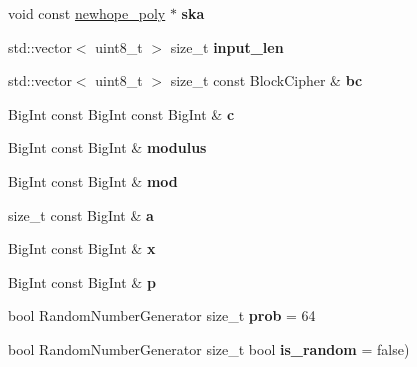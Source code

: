 \begin{DoxyCompactItemize}
\item 
\mbox{\label{namespace_botan_a5ed03ef32cb37696f691920d798ba5bf}} 
void const \hyperlink{class_botan_1_1newhope__poly}{newhope\+\_\+poly} $\ast$ {\bfseries ska}
\item 
\mbox{\label{namespace_botan_af2fdafc2bb9677e7dec106e354736ae7}} 
std\+::vector$<$ uint8\+\_\+t $>$ size\+\_\+t {\bfseries input\+\_\+len}
\item 
\mbox{\label{namespace_botan_aa3cd2a6f3e8e5bfbb61a6a5b9ae76cec}} 
std\+::vector$<$ uint8\+\_\+t $>$ size\+\_\+t const Block\+Cipher \& {\bfseries bc}
\item 
\mbox{\label{namespace_botan_a1e64c91f05991b0a02079e0ba3225ff8}} 
Big\+Int const Big\+Int const Big\+Int \& {\bfseries c}
\item 
\mbox{\label{namespace_botan_a8d69890b04eee09076549d41931e11de}} 
Big\+Int const Big\+Int \& {\bfseries modulus}
\item 
\mbox{\label{namespace_botan_a6330856f1c9ef8c750e0c95105b1c79d}} 
Big\+Int const Big\+Int \& {\bfseries mod}
\item 
\mbox{\label{namespace_botan_a1c1e899cf8ed8ddd0da7fbeb49db22fc}} 
size\+\_\+t const Big\+Int \& {\bfseries a}
\item 
\mbox{\label{namespace_botan_a467a48982b88815c38f6fbcc34bfbed0}} 
Big\+Int const Big\+Int \& {\bfseries x}
\item 
\mbox{\label{namespace_botan_a028be10ed8f4f6bd7b8d60b44d8f2a0e}} 
Big\+Int const Big\+Int \& {\bfseries p}
\item 
\mbox{\label{namespace_botan_a827683801983260944f1888096e6c079}} 
bool Random\+Number\+Generator size\+\_\+t {\bfseries prob} = 64
\item 
\mbox{\label{namespace_botan_a922dfa74ff691f459b48b62c48a72857}} 
bool Random\+Number\+Generator size\+\_\+t bool {\bfseries is\+\_\+random} = false)

\end{DoxyCompactItemize}
